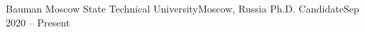 
    \resumeSubheading
    {Bauman Moscow State Technical University}{Moscow, Russia}
    {Ph.D. Candidate}{Sep 2020 -- Present}
    \begin{itemize}[leftmargin=0in, label={}]
          \small{\item{
          }}
    \end{itemize}